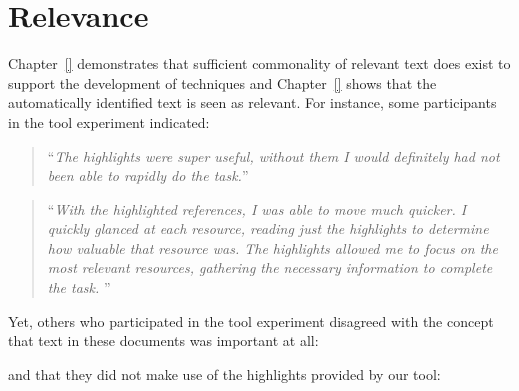 



\section{Relevance}
\label{cp7:tools}

 Chapter~\ref{} demonstrates
that sufficient commonality of relevant
text does exist to support the development
of techniques and Chapter~\ref{} shows
that the automatically identified text
is seen as relevant. For instance,
some participants in the \acs{tool}
experiment indicated:

\smallskip
\begin{footnotesize}
    \begin{quote}
        ``\textit{The highlights were super useful, without them I would definitely had not been able to rapidly do the task.}''
    \end{quote}
\end{footnotesize}


\begin{footnotesize}
\begin{quote}
    ``\textit{With the highlighted references, I was able to move much quicker. I quickly glanced at each resource, reading just the highlights to determine how valuable that resource was. The highlights allowed me to focus on the most relevant resources, gathering the necessary information to complete the task. 
}''
\end{quote}
\end{footnotesize}

Yet, others who participated in the \acs{tool}
experiment disagreed with the concept that text
in these documents was important at all:



and that they did not make use of the highlights provided by our tool:




